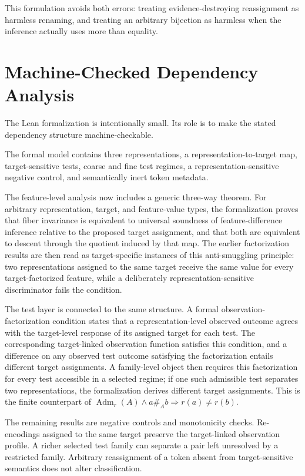 \documentclass[11pt]{article}
\begin{document}
This formulation avoids both errors: treating evidence-destroying reassignment as harmless renaming, and treating an arbitrary bijection as harmless when the inference actually uses more than equality.

\section{Machine-Checked Dependency Analysis}

The Lean formalization is intentionally small. Its role is to make the stated dependency structure machine-checkable.

The formal model contains three representations, a representation-to-target map, target-sensitive tests, coarse and fine test regimes, a representation-sensitive negative control, and semantically inert token metadata.

The feature-level analysis now includes a generic three-way theorem. For arbitrary representation, target, and feature-value types, the formalization proves that fiber invariance is equivalent to universal soundness of feature-difference inference relative to the proposed target assignment, and that both are equivalent to descent through the quotient induced by that map. The earlier factorization results are then read as target-specific instances of this anti-smuggling principle: two representations assigned to the same target receive the same value for every target-factorized feature, while a deliberately representation-sensitive discriminator fails the condition.

The test layer is connected to the same structure. A formal observation-factorization condition states that a representation-level observed outcome agrees with the target-level response of its assigned target for each test. The corresponding target-linked observation function satisfies this condition, and a difference on any observed test outcome satisfying the factorization entails different target assignments. A family-level object then requires this factorization for every test accessible in a selected regime; if one such admissible test separates two representations, the formalization derives different target assignments. This is the finite counterpart of \(\operatorname{Adm}_r(A)\land a\mathrel{\#_A}b\Rightarrow r(a)\neq r(b)\).

The remaining results are negative controls and monotonicity checks. Re-encodings assigned to the same target preserve the target-linked observation profile. A richer selected test family can separate a pair left unresolved by a restricted family. Arbitrary reassignment of a token absent from target-sensitive semantics does not alter classification.
\end{document}

